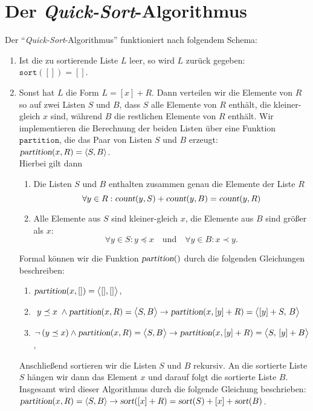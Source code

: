 \section{Der \emph{Quick-Sort}-Algorithmus}
Der ``\emph{Quick-Sort}-Algorithmus'' funktioniert nach folgendem Schema:
\begin{enumerate}
\item Ist die zu sortierende Liste $L$ leer, so wird $L$
      zur\"uck gegeben: \\[0.2cm]
      \hspace*{1.3cm} $\mathtt{sort}([]) = []$.
\item Sonst hat $L$ die Form $L = [x] + R$.
      Dann verteilen wir die Elemente von $R$ so auf zwei Listen $S$ und $B$, 
      dass $S$ alle Elemente von $R$ enth\"alt, die kleiner-gleich $x$ sind, w\"ahrend $B$ die
      restlichen Elemente von $R$ enth\"alt. 
      Wir implementieren die Berechnung der beiden Listen \"uber eine Funktion
      $\mathtt{partition}$, die das Paar von Listen $S$ und $B$ erzeugt: 
      \\[0.2cm]
      \hspace*{1.3cm}
      $\textsl{partition}(x,R) = \langle S,B \rangle$.
      \\[0.2cm]
      Hierbei gilt dann 
      \begin{enumerate}
      \item Die Listen $S$ und $B$ enthalten zusammen genau die Elemente der Liste $R$
            \[ \forall y \in R: \textsl{count}(y,S) + \textsl{count}(y,B) = \textsl{count}(y,R) \]
      \item Alle Elemente aus $S$ sind kleiner-gleich $x$, die Elemente aus $B$ sind
            gr\"o{\ss}er als $x$:
            \[ \forall y \in S: y \preceq x \quad \mbox{und} \quad \forall y \in B: x \prec y. \]
      \end{enumerate}
      Formal k\"onnen wir die Funktion $\textsl{partition}()$ durch die folgenden
      Gleichungen beschreiben:
      \begin{enumerate}
      \item $\textsl{partition}(x, []) = \bigl\langle[], []\bigr\rangle$,
      \item \quad 
            $\; y \preceq x\; \wedge \textsl{partition}(x,R) = \bigl\langle S, B \bigr\rangle \rightarrow 
             \textsl{partition}(x, [y] + R) = \bigl\langle [y] + S,\, B \bigr\rangle$
      \item $\neg\, (y \preceq x) \wedge \textsl{partition}(x,R) = \bigl\langle S, B \bigr\rangle \rightarrow 
             \textsl{partition}(x, [y] + R) = \bigl\langle S,\, [y] + B \bigr\rangle$,
      \end{enumerate}
      Anschlie{\ss}end sortieren wir die Listen $S$ und $B$ rekursiv.
      An die sortierte Liste $S$ h\"angen wir dann das Element $x$ und darauf folgt die
      sortierte Liste $B$.  Insgesamt wird dieser Algorithmus durch die folgende Gleichung
      beschrieben:
      \\[0.2cm]
      \hspace*{1.3cm}
      $\textsl{partition}(x,R) = \langle S,B \rangle \rightarrow 
       \textsl{sort}([x] + R) = \textsl{sort}(S) + [x] + \textsl{sort}(B)$.
\end{enumerate}
